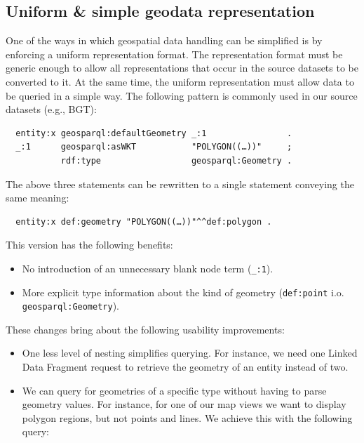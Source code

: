 \documentclass[a4paper]{scrartcl}
\newcommand{\textt}[1]{{\small \texttt{#1}}}
\begin{document}
\subsection{Uniform \& simple geodata representation}
\label{sec:uniform_representation}

One of the ways in which geospatial data handling can be simplified is
by enforcing a uniform representation format.  The representation
format must be generic enough to allow all representations that occur
in the source datasets to be converted to it.  At the same time, the
uniform representation must allow data to be queried in a simple way.
The following pattern is commonly used in our source datasets (e.g.,
BGT):

\begin{verbatim}
  entity:x geosparql:defaultGeometry _:1                .
  _:1      geosparql:asWKT           "POLYGON((…))"     ;
           rdf:type                  geosparql:Geometry .
\end{verbatim}

The above three statements can be rewritten to a single statement
conveying the same meaning:

\begin{verbatim}
  entity:x def:geometry "POLYGON((…))"^^def:polygon .
\end{verbatim}

This version has the following benefits:

\begin{itemize}

\item No introduction of an unnecessary blank node term (\textt{\_:1}).

\item More explicit type information about the kind of geometry
  (\textt{def:point} i.o. \textt{geosparql:Geometry}).

\end{itemize}

These changes bring about the following usability improvements:

\begin{itemize}
  
\item One less level of nesting simplifies querying.  For instance, we
  need one Linked Data Fragment request to retrieve the geometry of an
  entity instead of two.

\item We can query for geometries of a specific type without having to
  parse geometry values.  For instance, for one of our map views we
  want to display polygon regions, but not points and lines.  We
  achieve this with the following query:

\end{itemize}
\end{document}
